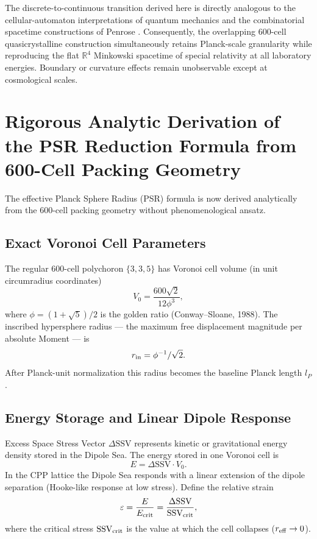 \documentclass[11pt,letterpaper]{article}
\begin{document}
The discrete-to-continuous transition derived here is directly analogous to the cellular-automaton interpretations of quantum mechanics \cite{thooft2016} and 
the combinatorial spacetime constructions of Penrose \cite{penrose1971}. Consequently, the overlapping 600-cell quasicrystalline construction 
simultaneously retains Planck-scale granularity while reproducing the flat $\mathbb{R}^4$ Minkowski spacetime of special relativity at all laboratory 
energies. Boundary or curvature effects remain unobservable except at cosmological scales.

\section{Rigorous Analytic Derivation of the PSR Reduction Formula from 600-Cell Packing Geometry}\label{app:D}

The effective Planck Sphere Radius (PSR) formula is now derived analytically from the 600-cell packing geometry without phenomenological ansatz.

\subsection{Exact Voronoi Cell Parameters}

The regular 600-cell polychoron \(\{3,3,5\}\) has Voronoi cell volume (in unit circumradius coordinates)
\[
V_0 = \frac{600\sqrt{2}}{12\phi^3},
\]
where \(\phi = (1 + \sqrt{5})/2\) is the golden ratio (Conway–Sloane, 1988). The inscribed hypersphere radius — the maximum free displacement magnitude per absolute Moment — is
\[
r_{\rm in} = \phi^{-1}/\sqrt{2}.
\]
After Planck-unit normalization this radius becomes the baseline Planck length \(l_P\).

\subsection{Energy Storage and Linear Dipole Response}

Excess Space Stress Vector \(\Delta\text{SSV}\) represents kinetic or gravitational energy density stored in the Dipole Sea. The energy stored in one Voronoi cell is
\[
E = \Delta\text{SSV} \cdot V_0.
\]
In the CPP lattice the Dipole Sea responds with a linear extension of the dipole separation (Hooke-like response at low stress). Define the relative strain
\[
\varepsilon = \frac{E}{E_{\rm crit}} = \frac{\Delta\text{SSV}}{\text{SSV}_{\rm crit}},
\]
where the critical stress \(\text{SSV}_{\rm crit}\) is the value at which the cell collapses (\(r_{\rm eff} \to 0\)).
\end{document}
